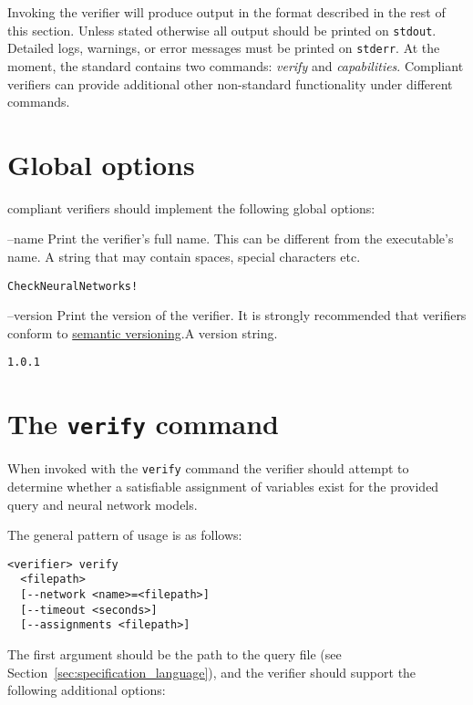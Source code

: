 Invoking the verifier will produce output in the format described in the rest of this section. Unless stated otherwise all output should be printed on \texttt{stdout}. Detailed logs, warnings, or error messages must be printed on \texttt{stderr}.
At the moment, the \vnnlib{} standard contains two commands: \emph{verify} and \emph{capabilities}. Compliant verifiers can provide additional other non-standard functionality under different commands. 

\section{Global options}

\vnnlib{} compliant verifiers should implement the following global options:

\clOutputOption
{--name}
{Print the verifier's full name. This can be different from the executable's name.}
{A string that may contain spaces, special characters etc.}
\begin{lstlisting}[style=bash]
%*\exampleVerifier* --name
CheckNeuralNetworks!
\end{lstlisting}

\clOutputOption
{--version}
{Print the version of the verifier. It is strongly recommended that verifiers conform to \href{https://semver.org/}{semantic versioning}.}{A version string.}
\begin{lstlisting}[style=bash]
%*\exampleVerifier* --version
1.0.1
\end{lstlisting}


\section{The \texttt{verify} command}
\label{sec:verify_command}

When invoked with the \texttt{verify} command  the verifier should attempt to determine whether a satisfiable assignment of variables exist for the provided \vnnlib{} query and neural network models.

The general pattern of usage is as follows:
\begin{lstlisting}[style=bash]
<verifier> verify 
  <filepath>
  [--network <name>=<filepath>]
  [--timeout <seconds>]
  [--assignments <filepath>]
\end{lstlisting}
The first argument should be the path to the \vnnlib{} query file (see Section~\ref{sec:specification_language}), and the verifier should support the following additional options:

